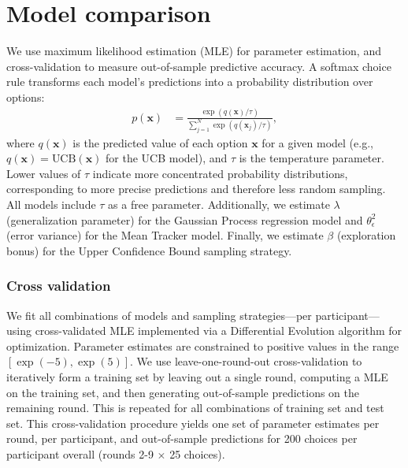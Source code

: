 \section*{Model comparison}
We use maximum likelihood estimation (MLE) for parameter estimation, and cross-validation to measure out-of-sample predictive accuracy. A softmax choice rule transforms each model's predictions into a probability distribution over options:
\begin{align}
p(\mathbf{x}) &= \frac{\exp(q(\mathbf{x})/\tau)}{\sum_{j=1}^{N}\exp(q(\mathbf{x}_j)/\tau)},
\label{eq:softmax}
\end{align}
where $q(\mathbf{x})$ is the predicted value of each option $\mathbf{x}$ for a given model (e.g., $q(\mathbf{x}) = \text{UCB}(\mathbf{x})$ for the UCB model), and $\tau$ is the temperature parameter. Lower values of $\tau$ indicate more concentrated probability distributions, corresponding to more precise predictions and therefore less random sampling. All models include $\tau$ as a free parameter. Additionally, we estimate $\lambda$ (generalization parameter) for the Gaussian Process regression model and $\theta^2_\epsilon$ (error variance) for the Mean Tracker model. Finally, we estimate $\beta$ (exploration bonus) for the Upper Confidence Bound sampling strategy.

\subsubsection*{Cross validation} 
We fit all combinations of models and sampling strategies---per participant---using cross-validated MLE implemented via a Differential Evolution algorithm for optimization. Parameter estimates are constrained to positive values in the range $[\exp(-5),\exp(5)]$. We use leave-one-round-out cross-validation to iteratively form a training set by leaving out a single round, computing a MLE on the training set, and then generating out-of-sample predictions on the remaining round. This is repeated for all combinations of training set and test set. This cross-validation procedure yields one set of parameter estimates per round, per participant, and out-of-sample predictions for 200 choices per participant overall (rounds 2-9 $\times$ 25 choices). 

